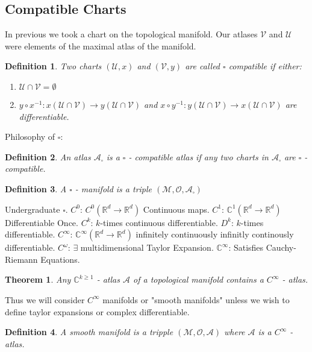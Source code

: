 \documentclass[10pt, oneside]{article}
\newcommand{\R}{\mathbb{R}}
\newcommand{\C}{\mathbb{C}}
\newcommand{\M}{\mathcal{M}}
\newtheorem{thm}{Theorem}
\newtheorem{defn}{Definition}
\begin{document}
  \subsection*{Compatible Charts}
     In previous we took a chart on the topological manifold. Our atlases $\mathcal{V}$ and $\mathcal{U}$ were elements of the maximal atlas of the manifold.
     \begin{defn}
        Two charts $(\mathcal{U},x)$ and $(\mathcal{V},y)$ are called $\square$ compatible if either:
        \begin{enumerate}
        \item $\mathcal{U} \cap \mathcal{V} = \emptyset$
        \item $y \circ x^{-1}: x(\mathcal{U} \cap \mathcal{V}) \to y(\mathcal{U} \cap \mathcal{V})$ and $x \circ y^{-1}: y(\mathcal{U} \cap \mathcal{V}) \to x(\mathcal{U} \cap \mathcal{V})$ are differentiable.
        \end{enumerate}
     \end{defn}
     Philosophy of $\square$:
        \begin{defn}
           An atlas $\mathcal{A}_\square$ is a $\square$ - compatible atlas if any two charts in $\mathcal{A}_\square$ are $\square$ - compatible.
        \end{defn}
        \begin{defn}
           A $\square$ - manifold is a triple $(\M, \mathcal{O}, \mathcal{A}_\square)$
        \end{defn}
     Undergraduate $\square$. $C^0$: $C^0 (\R^d \to \R^d)$ Continuous maps. $C^1$: $\C^1 (\R^d \to \R^d)$ Differentiable Once. $C^k$: $k$-times continuous differentiable.
     $D^k$: $k$-times differentiable. $C^\infty$: $\C^\infty (\R^d \to \R^d)$ infinitely continuously infinitly continously differentiable. $C^\omega$: $\exists$ multidimensional Taylor Expansion.
     $\C^\infty$: Satisfies Cauchy-Riemann Equations.
     \begin{thm}
        Any $\C^{k \geq 1}$ - atlas $\mathcal{A}$ of a topological manifold contains a $C^\infty$ - atlas.
     \end{thm}
     Thus we will consider $C^\infty$ manifolds or "smooth manifolds" unless we wish to define taylor expansions or complex differentiable.
     \begin{defn}
        A smooth manifold is a tripple $(\M,\mathcal{O}, \mathcal{A})$ where $\mathcal{A}$ is a $C^\infty$ - atlas.
     \end{defn}
\end{document}
